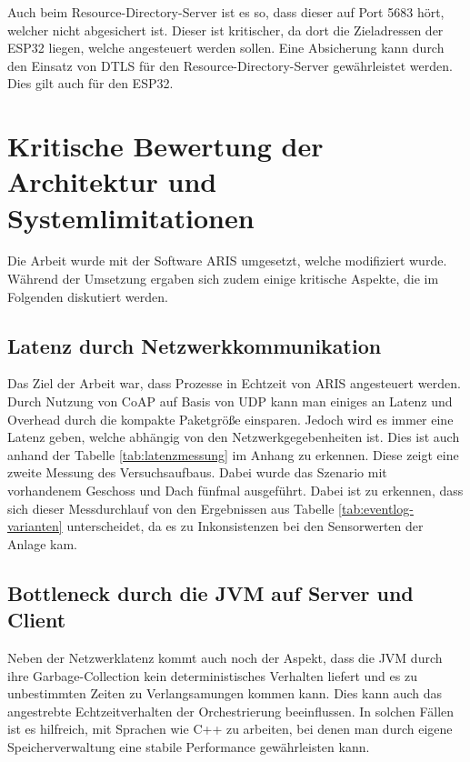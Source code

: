 Auch beim Resource-Directory-Server ist es so, dass dieser auf Port 5683 hört, welcher nicht abgesichert ist. Dieser
ist kritischer, da dort die Zieladressen der ESP32 liegen, welche angesteuert werden sollen. Eine Absicherung kann
durch den Einsatz von \ac{DTLS} \cite{wendzel_it-sicherheit_2018} für den Resource-Directory-Server gewährleistet werden. Dies gilt auch für den ESP32.

\newpage

\section{Kritische Bewertung der Architektur und Systemlimitationen}

Die Arbeit wurde mit der Software ARIS umgesetzt, welche modifiziert wurde. Während
der Umsetzung ergaben sich zudem einige kritische Aspekte, die im Folgenden diskutiert werden.

\subsection{Latenz durch Netzwerkkommunikation}

Das Ziel der Arbeit war, dass Prozesse in Echtzeit von ARIS angesteuert werden. Durch Nutzung von CoAP auf Basis von UDP kann man 
einiges an Latenz und Overhead durch die kompakte Paketgröße einsparen. Jedoch wird es immer eine Latenz geben, welche abhängig von den Netzwerkgegebenheiten ist. Dies ist auch anhand der Tabelle \ref{tab:latenzmessung} im Anhang zu erkennen. 
Diese zeigt eine zweite Messung des Versuchsaufbaus. Dabei wurde das Szenario mit vorhandenem Geschoss und Dach fünfmal ausgeführt. Dabei ist zu erkennen, dass sich dieser Messdurchlauf von den Ergebnissen aus Tabelle \ref{tab:eventlog-varianten} unterscheidet,
da es zu Inkonsistenzen bei den Sensorwerten der Anlage kam.

\subsection{Bottleneck durch die JVM auf Server und Client}
\label{jvm-bottleneck}

Neben der Netzwerklatenz kommt auch noch der Aspekt, dass die \ac{JVM} durch ihre Garbage-Collection kein deterministisches Verhalten liefert und 
es zu unbestimmten Zeiten zu Verlangsamungen kommen kann. \cite{carpen-amarie_performance_2015} \cite{al-jaroodi_object-reuse_2005} Dies kann auch das angestrebte Echtzeitverhalten der Orchestrierung beeinflussen. In solchen
Fällen ist es hilfreich, mit Sprachen wie C++ zu arbeiten, bei denen man durch eigene Speicherverwaltung eine stabile Performance gewährleisten kann. \cite{stroustrup_brief_2015} \cite{herter_timing-predictable_2014}

